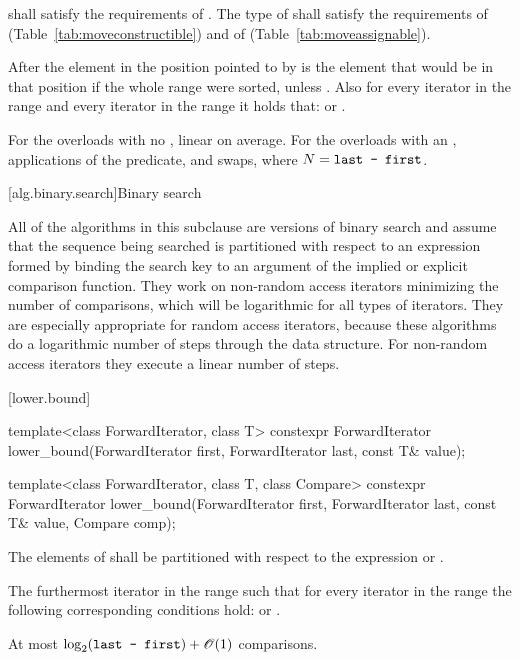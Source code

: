 \begin{itemdescr}
\pnum
\requires
{} shall satisfy the requirements of
. The type
of  shall satisfy the requirements of
 (Table~\ref{tab:moveconstructible}) and of
 (Table~\ref{tab:moveassignable}).

\pnum
\effects
After
the element in the position pointed to by 
is the element that would be
in that position if the whole range were sorted, unless .
Also for every iterator
in the range
and every iterator
in the range
it holds that:
or
.

\pnum
\complexity
For the overloads with no , linear on average.
For the overloads with an ,  applications of
the predicate, and  swaps, where $N = \texttt{last - first}$.
\end{itemdescr}

[alg.binary.search]{Binary search}

\pnum
All of the algorithms in this subclause are versions of binary search
and assume that the sequence being searched is partitioned with respect to
an expression formed by binding the search key to an argument of the
implied or explicit comparison function.
They work on non-random access iterators minimizing the number of comparisons,
which will be logarithmic for all types of iterators.
They are especially appropriate for random access iterators,
because these algorithms do a logarithmic number of steps
through the data structure.
For non-random access iterators they execute a linear number of steps.

[lower.bound]{}

%
\begin{itemdecl}
template<class ForwardIterator, class T>
  constexpr ForwardIterator
    lower_bound(ForwardIterator first, ForwardIterator last,
                const T& value);

template<class ForwardIterator, class T, class Compare>
  constexpr ForwardIterator
    lower_bound(ForwardIterator first, ForwardIterator last,
                const T& value, Compare comp);
\end{itemdecl}

\begin{itemdescr}
\pnum
\requires
The elements
of
shall be partitioned with respect to the expression
or
.

\pnum
\returns
The furthermost iterator
in the range
such that for every iterator
in the range
the following corresponding conditions hold:
or
.

\pnum
\complexity
At most
$\log_2(\texttt{last - first}) + \mathscr{O}(1)$
comparisons.
\end{itemdescr}

